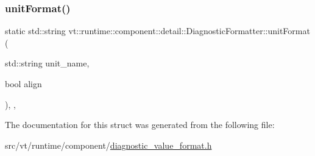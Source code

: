 \subsubsection{\texorpdfstring{unit\+Format()}{unitFormat()}}
{\footnotesize\ttfamily static std\+::string vt\+::runtime\+::component\+::detail\+::\+Diagnostic\+Formatter\+::unit\+Format (\begin{DoxyParamCaption}\item[{std\+::string}]{unit\+\_\+name,  }\item[{bool}]{align }\end{DoxyParamCaption})\hspace{0.3cm}{\ttfamily [inline]}, {\ttfamily [static]}, {\ttfamily [private]}}



The documentation for this struct was generated from the following file\+:\begin{DoxyCompactItemize}
\item 
src/vt/runtime/component/\hyperlink{diagnostic__value__format_8h}{diagnostic\+\_\+value\+\_\+format.\+h}\end{DoxyCompactItemize}
